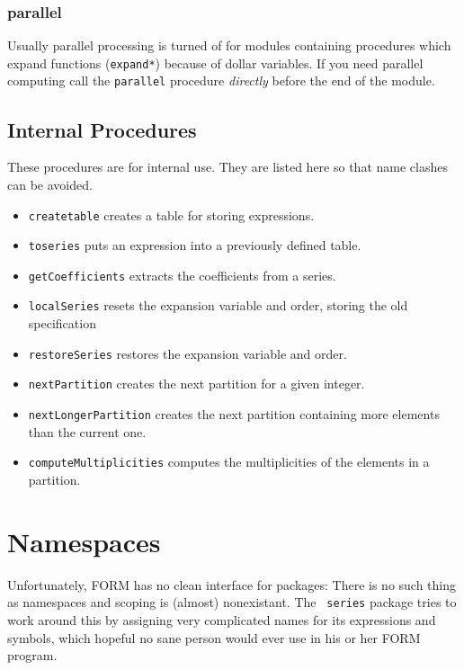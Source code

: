 \documentclass{article}
\begin{document}
\subsubsection{parallel}
\label{sec:parallel}

Usually parallel processing is turned of for modules containing
procedures which expand functions ({\tt expand*}) because of
dollar variables. If you need
parallel computing call the {\tt parallel} procedure {\em directly}
  before the end of the module.

\subsection{Internal Procedures}
\label{sec:proc_internal}
These procedures are for internal use. They are listed here so that name
clashes can be avoided.
\begin{itemize}
\item {\tt createtable} creates a table for storing expressions.
\item {\tt toseries} puts an expression into a previously defined table.
\item {\tt getCoefficients} extracts the coefficients from a series.
\item {\tt localSeries} resets the expansion variable and order, storing
  the old specification
\item {\tt restoreSeries} restores the expansion variable and order.
\item {\tt nextPartition} creates the next partition for a given integer.
\item {\tt nextLongerPartition} creates the next partition containing
  more elements than the current one.
\item {\tt computeMultiplicities} computes the multiplicities of the
  elements in a partition.
\end{itemize}

\section{Namespaces}
\label{sec:namesp}

Unfortunately, FORM has no clean interface for packages: There is no
such thing as namespaces and scoping is (almost) nonexistant. The {\tt
  series} package tries to work around this by assigning very complicated
names for its expressions and symbols, which hopeful no sane person
would ever use in his or her FORM program.
\end{document}
